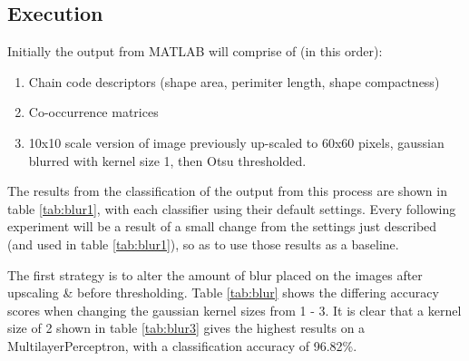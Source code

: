 \documentclass[12pt]{article}
\begin{document}
  \subsection{Execution}
    Initially the output from MATLAB will comprise of (in this order):
    \begin{enumerate}
      \item Chain code descriptors (shape area, perimiter length, shape compactness)
      \item Co-occurrence matrices
      \item 10x10 scale version of image previously up-scaled to 60x60 pixels, gaussian blurred with kernel size 1, then Otsu thresholded.
    \end{enumerate}
    The results from the classification of the output from this process are shown in table \ref{tab:blur1}, with each classifier using their default settings. Every following experiment will be a result of a small change from the settings just described (and used in table \ref{tab:blur1}), so as to use those results as a baseline.

    \newpage
    The first strategy is to alter the amount of blur placed on the images after upscaling \& before thresholding. Table \ref{tab:blur} shows the differing accuracy scores when changing the gaussian kernel sizes from 1 - 3. It is clear that a kernel size of 2 shown in table \ref{tab:blur3} gives the highest results on a MultilayerPerceptron, with a classification accuracy of 96.82\%.
\end{document}
